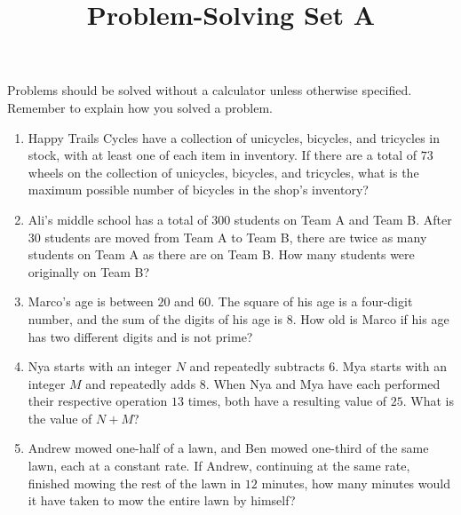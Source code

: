 \documentclass{article}
\title{Problem-Solving Set A}
\author{}
\date{}
\begin{document}
\maketitle
\noindent Problems should be solved without a calculator unless otherwise specified.
Remember to explain how you solved a problem.
\begin{multicols}{2}
    \begin{enumerate}
        \item Happy Trails Cycles have a collection of unicycles, bicycles, and tricycles in stock, with at least one of each item in inventory.
            If there are a total of $73$ wheels on the collection of unicycles, bicycles, and tricycles, what is the maximum possible number of bicycles in the shop's inventory? 
        \vspace{3cm}
        \item Ali's middle school has a total of $300$ students on Team A and Team B.
            After $30$ students are moved from Team A to Team B, there are twice as many students on Team A as there are on Team B.
            How many students were originally on Team B? 
        \vspace{3cm}
        \item Marco's age is between $20$ and $60$.
            The square of his age is a four-digit number, and the sum of the digits of his age is $8$.
            How old is Marco if his age has two different digits and is not prime?
        \vspace{3cm}
        \columnbreak
        \item Nya starts with an integer $N$ and repeatedly subtracts $6$.
            Mya starts with an integer $M$ and repeatedly adds $8$.
            When Nya and Mya have each performed their respective operation $13$ times, both have a resulting value of $25$.
            What is the value of $N + M$?
        \vspace{3cm}
        \item Andrew mowed one-half of a lawn, and Ben mowed one-third of the same lawn, each at a constant rate.
            If Andrew, continuing at the same rate, finished mowing the rest of the lawn in $12$ minutes, how many minutes would it have taken to mow the entire lawn by himself?
        \vspace{3cm}
    \end{enumerate}
\end{multicols}
\end{document}
